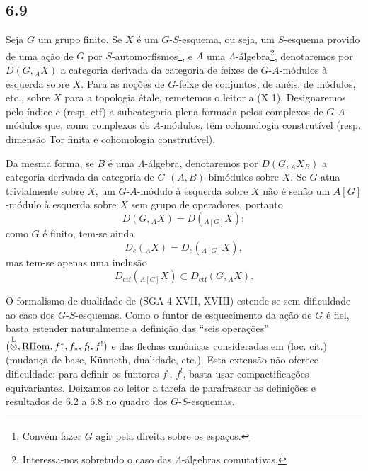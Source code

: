 \subsection*{6.9}
Seja $G$ um grupo finito. Se $X$ é um $G$-$S$-esquema, ou seja, um $S$-esquema provido de uma ação de $G$ por $S$-automorfismos\footnote{Convém fazer $G$ agir pela direita sobre os espaços.}, e $A$ uma $\Lambda$-álgebra\footnote{Interessa-nos sobretudo o caso das $\Lambda$-álgebras comutativas.}, denotaremos por $D(G,{}_AX)$ a categoria derivada da categoria de feixes de $G$-$A$-módulos à esquerda sobre $X$. Para as noções de $G$-feixe de conjuntos, de anéis, de módulos, etc., sobre $X$ para a topologia étale, remetemos o leitor a (X 1). Designaremos pelo índice $c$ (resp. ctf) a subcategoria plena formada pelos complexos de $G$-$A$-módulos que, como complexos de $A$-módulos, têm cohomologia construtível (resp. dimensão Tor finita e cohomologia construtível).

Da mesma forma, se $B$ é uma $\Lambda$-álgebra, denotaremos por $D(G,{}_AX_B)$ a categoria derivada da categoria de $G$-$(A,B)$-bimódulos sobre $X$. Se $G$ atua trivialmente sobre $X$, um $G$-$A$-módulo à esquerda sobre $X$ não é senão um $A[G]$-módulo à esquerda sobre $X$ sem grupo de operadores, portanto
\[
D(G,{}_AX)=D({}_{A[G]}X);
\]
como $G$ é finito, tem-se ainda
\[
D_c({}_AX)=D_c({}_{A[G]}X),
\]
mas tem-se apenas uma inclusão
\[
D_{\mathrm{ctf}}({}_{A[G]}X)\subset D_{\mathrm{ctf}}(G,{}_AX).
\]

O formalismo de dualidade de (SGA 4 XVII, XVIII) estende-se sem dificuldade ao caso dos $G$-$S$-esquemas. Como o funtor de esquecimento da ação de $G$ é fiel, basta estender naturalmente a definição das ``seis operações'' $(\overset{\mathrm L}{\otimes},\underline{\mathrm{RHom}},f^*,f_*,f_!,f^!)$ e das flechas canônicas consideradas em (loc. cit.) (mudança de base, Künneth, dualidade, etc.). Esta extensão não oferece dificuldade: para definir os funtores $f_!$, $f^!$, basta usar compactificações equivariantes. Deixamos ao leitor a tarefa de parafrasear as definições e resultados de 6.2 a 6.8 no quadro dos $G$-$S$-esquemas.

